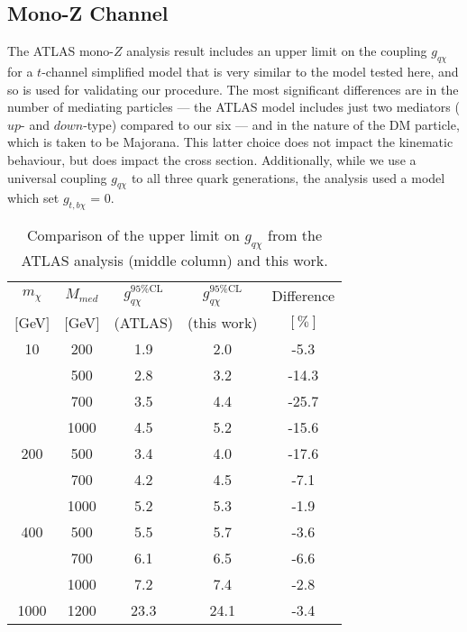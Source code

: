 \subsection{Mono-Z Channel}
\label{monoZ_validation}
\begin{flushleft}

\bigskip

The ATLAS mono-$Z$ analysis result includes an upper limit on the coupling $g_{q \chi}$ for a $t$-channel simplified model that is very similar to the model tested here, and so is used for validating our procedure. The most significant differences are in the number of mediating particles --- the ATLAS model includes just two mediators ($up$- and $down$-type) compared to our six --- and in the nature of the DM particle, which is taken to be Majorana. This latter choice does not impact the kinematic behaviour, but does impact the cross section. Additionally, while we use a universal coupling $g_{q \chi}$ to all three quark generations, the analysis used a model which set $g_{t,b \chi}$ = 0.

\begin{table}
\begin{center}
\begin{tabular}{| c | c | c | c | c |}
\hline
\hline
$m_{\chi}$ & $M_{med}$ & $g_{q \chi}^{95\%\mathrm{CL}}$ & $g_{q \chi}^{95\%\mathrm{CL}}$ & Difference \T \\
$[$GeV$]$ & $[$GeV$]$ & (ATLAS) & (this work) & $[\%]$ \B \\
\hline
10 & 200 & 1.9 & 2.0 & -5.3 \T \\
 & 500 & 2.8 & 3.2 & -14.3 \\
 & 700 & 3.5 & 4.4 & -25.7 \\
 & 1000 & 4.5 & 5.2 & -15.6 \\
200 & 500 & 3.4 & 4.0 & -17.6 \T \\
 & 700 & 4.2 & 4.5 & -7.1 \\
 & 1000 & 5.2 & 5.3 & -1.9 \\
400 & 500 & 5.5 & 5.7 & -3.6 \T \\
 & 700 & 6.1 & 6.5 & -6.6 \\
 & 1000 & 7.2 & 7.4 & -2.8 \\
1000 & 1200 & 23.3 & 24.1 & -3.4 \T \B \\
\hline
\hline
\end{tabular}
\end{center}
\caption{Comparison of the upper limit on $g_{q \chi}$ from the ATLAS analysis (middle column) and this work.}
\label{tab:monoZvalidation}
\end{table} 


\end{flushleft}
